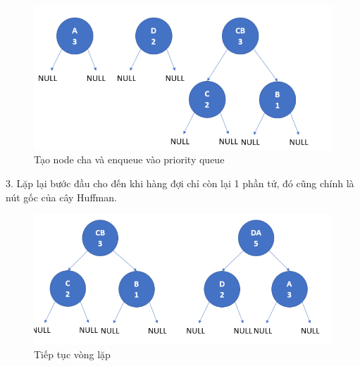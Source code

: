 \documentclass[14pt]{extreport}
\begin{document}
\begin{center}
    \begin{figure}[H]
    \begin{center}
     \includegraphics[scale=0.8]{createNode_1.PNG}
    \end{center}
    \caption{Tạo node cha và enqueue vào priority queue}
    \label{refhinh1}
    \end{figure}
\end{center}

3. Lặp lại bước đầu cho đến khi hàng đợi chỉ còn lại 1 phần tử, đó cũng chính là nút gốc của cây Huffman.

\begin{center}
    \begin{figure}[H]
    \begin{center}
     \includegraphics[scale=0.7]{createNode_2.PNG}
    \end{center}
    \caption{Tiếp tục vòng lặp}
    \label{refhinh1}
    \end{figure}
\end{center}
\end{document}
